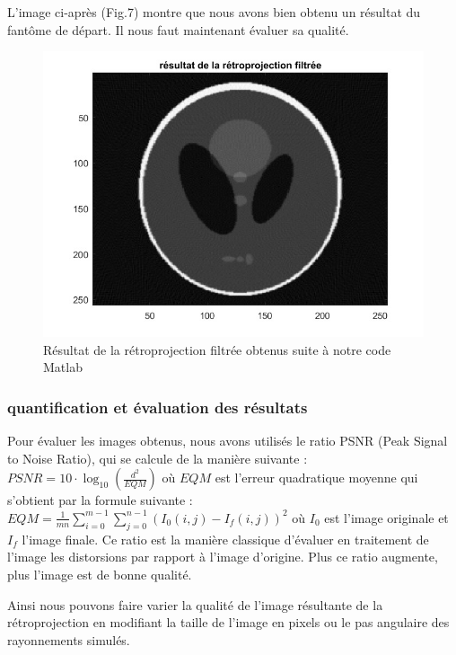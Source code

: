 \documentclass[conference]{IEEEtran}
\begin{document}
L'image ci-après (Fig.7) montre que nous avons bien obtenu un résultat du fantôme de départ. Il nous faut maintenant évaluer sa qualité.

\begin{figure}[H]
\centering
\includegraphics[scale=0.5]{rsultat-de-la-rtroprojetion-filtre}
	\caption[Résultat de la rétroprojection filtrée obtenus suite à notre code Matlab]{Résultat de la rétroprojection filtrée obtenus suite à notre code Matlab}
\label{fig:gallery}
\end{figure}

\subsubsection{quantification et évaluation des résultats}

Pour évaluer les images obtenus, nous avons utilisés le ratio PSNR (Peak Signal to Noise Ratio), qui se calcule de la manière suivante :
$PSNR=10\cdot\log_{10} (\frac{d^2}{EQM})$
où $EQM$ est l'erreur quadratique moyenne qui s'obtient par la formule suivante :
$EQM=\frac{1}{mn}\sum_{i=0}^{m-1}\sum_{j=0}^{n-1}(I_0(i,j)-I_f(i,j))^2$
où $I_0$ est l'image originale et $I_f$ l'image finale.
Ce ratio est la manière classique d'évaluer en traitement de l'image les distorsions par rapport à l'image d'origine. Plus ce ratio augmente, plus l'image est de bonne qualité.

Ainsi nous pouvons faire varier la qualité de l'image résultante de la rétroprojection en modifiant la taille de l'image en pixels ou le pas angulaire des rayonnements simulés.
\end{document}

